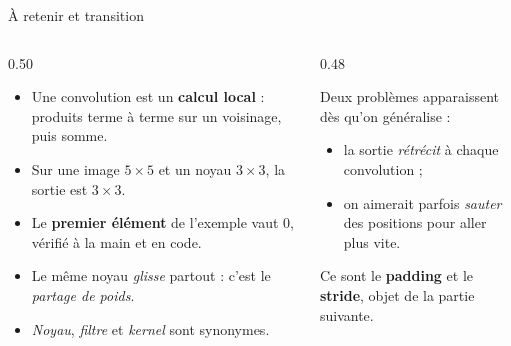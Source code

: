 \begin{frame}{À retenir et transition}
\begin{columns}[t]
\begin{column}{0.50\textwidth}
\begin{kbox}[À retenir]
\begin{itemize}
  \item Une convolution est un \textbf{calcul local} : produits terme à terme sur un
  voisinage, puis somme.
  \item Sur une image $5 \times 5$ et un noyau $3 \times 3$, la sortie est $3 \times 3$.
  \item Le \textbf{premier élément} de l'exemple vaut $0$, vérifié à la main et en code.
  \item Le même noyau \emph{glisse} partout : c'est le \emph{partage de poids}.
  \item \emph{Noyau}, \emph{filtre} et \emph{kernel} sont synonymes.
\end{itemize}
\end{kbox}
\end{column}
\begin{column}{0.48\textwidth}
\begin{wbox}
Deux problèmes apparaissent dès qu'on généralise :
\begin{itemize}
  \item la sortie \emph{rétrécit} à chaque convolution ;
  \item on aimerait parfois \emph{sauter} des positions pour aller plus vite.
\end{itemize}
Ce sont le \textbf{padding} et le \textbf{stride}, objet de la partie suivante.
\end{wbox}
\end{column}
\end{columns}
\end{frame}